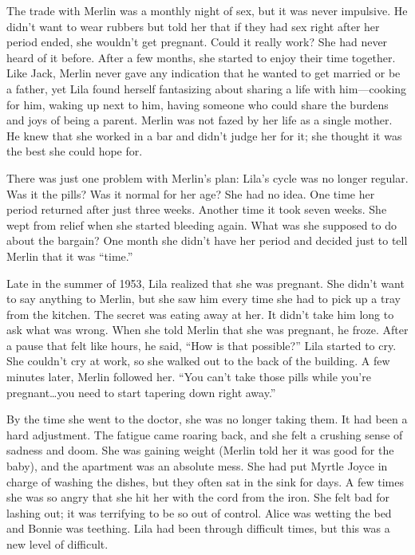 \documentclass[
  letterpaper,
]{book}
\begin{document}
The trade with Merlin was a monthly night of sex, but it was never
impulsive. He didn't want to wear rubbers but told her that if they had
sex right after her period ended, she wouldn't get pregnant. Could it
really work? She had never heard of it before. After a few months, she
started to enjoy their time together. Like Jack, Merlin never gave any
indication that he wanted to get married or be a father, yet Lila found
herself fantasizing about sharing a life with him---cooking for him,
waking up next to him, having someone who could share the burdens and
joys of being a parent. Merlin was not fazed by her life as a single
mother. He knew that she worked in a bar and didn't judge her for it;
she thought it was the best she could hope for.

There was just one problem with Merlin's plan: Lila's cycle was no
longer regular. Was it the pills? Was it normal for her age? She had no
idea. One time her period returned after just three weeks. Another time
it took seven weeks. She wept from relief when she started bleeding
again. What was she supposed to do about the bargain? One month she
didn't have her period and decided just to tell Merlin that it was
``time.''

Late in the summer of 1953, Lila realized that she was pregnant. She
didn't want to say anything to Merlin, but she saw him every time she
had to pick up a tray from the kitchen. The secret was eating away at
her. It didn't take him long to ask what was wrong. When she told Merlin
that she was pregnant, he froze. After a pause that felt like hours, he
said, ``How is that possible?'' Lila started to cry. She couldn't cry at
work, so she walked out to the back of the building. A few minutes
later, Merlin followed her. ``You can't take those pills while you're
pregnant\ldots you need to start tapering down right away.''

By the time she went to the doctor, she was no longer taking them. It
had been a hard adjustment. The fatigue came roaring back, and she felt
a crushing sense of sadness and doom. She was gaining weight (Merlin
told her it was good for the baby), and the apartment was an absolute
mess. She had put Myrtle Joyce in charge of washing the dishes, but they
often sat in the sink for days. A few times she was so angry that she
hit her with the cord from the iron. She felt bad for lashing out; it
was terrifying to be so out of control. Alice was wetting the bed and
Bonnie was teething. Lila had been through difficult times, but this was
a new level of difficult.
\end{document}
